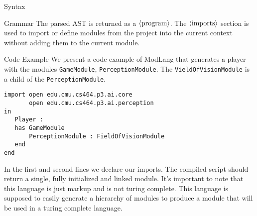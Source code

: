 \documentclass[11pt]{article}
\newcommand\nonterm[1]{\langle\textnormal{#1}\rangle}
\begin{document}
\begin{section}{Syntax}
\begin{subsection}{Grammar}
The parsed AST is returned as a $\nonterm{program}$. The $\nonterm{imports}$ section is used to import or define  modules from the project into the current context without adding them to the current module.
\end{subsection}
\begin{subsection}{Code Example}
We present a code example of ModLang that generates a player with the modules \verb|GameModule|, \verb|PerceptionModule|. The \verb|VieldOfVisionModule| is a child of the \verb|PerceptionModule|.
\begin{verbatim}
import open edu.cmu.cs464.p3.ai.core
       open edu.cmu.cs464.p3.ai.perception
in 
   Player : 
   has GameModule
       PerceptionModule : FieldOfVisionModule
   end
end
\end{verbatim}
In the first and second lines we declare our imports. The compiled script should return a single, fully initialized and linked module. It's important to note that this language is just markup and is not turing complete. This language is supposed to easily generate a hierarchy of modules to produce a module that will be used in a turing complete language. 
\end{subsection}
\end{section}
\end{document}
